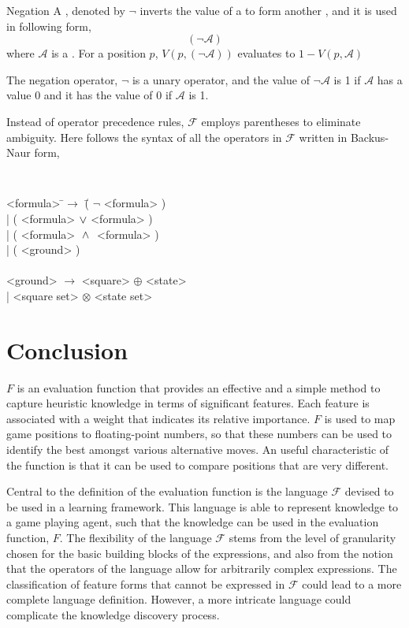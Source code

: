 \begin{definition} {Negation}
A , denoted by $\neg$ inverts the value of a  \mywff{} to form another \mywff, and it is used in following form,
\[
( \neg\mathcal{A} )
\]
where $\mathcal{A}$  is a \mywff.
For a position $p$,  $V(p,(\neg \mathcal{A}))$ evaluates to $1 - V(p,\mathcal{A})$
\end{definition}
The negation operator, $\neg$ is a unary operator, and  the value of $\neg \mathcal{A}$ is 1 if $\mathcal{A}$ has a value 0 and it has the value of 0 if $\mathcal{A}$ is 1.

Instead of operator precedence rules, $\mathcal{F}$ employs parentheses to eliminate ambiguity. Here follows the syntax of all the operators in $\mathcal{F}$ written in Backus-Naur form,

{\tt \small
\begin{tabbing}
<formula> \=$\rightarrow$ \= ( $\neg$ <formula> ) \\
	\>| \> ( <formula> $\vee$ <formula> ) \\
	\>|\> ( <formula> $\;\wedge\;$ <formula> ) \\
	\>|\> ( <ground> )  \\
	\\
<ground> \>$\rightarrow$\> <square> $\oplus$ <state>	\\
	\>|\> <square set> $\otimes$ <state set> \\
\end{tabbing}
}	

\section{Conclusion}
\label{sec:knowledge-conclusion}
 
$F$ is an evaluation function that provides an effective and a simple method to capture heuristic knowledge in terms of significant features. Each feature is associated with a weight that indicates its relative importance.  $F$ is used to map game positions to floating-point numbers, so that these numbers can be used to identify the best amongst various alternative moves. An useful characteristic of the function is that it can be used to compare positions that are very different.

Central to the definition of the evaluation function is the language $\mathcal{F}$ devised to be used in a learning framework. This language is able to represent knowledge to a game playing agent, such that the knowledge can be used in the evaluation function, $F$. The flexibility of the language $\mathcal{F}$ stems from the level of granularity chosen for the basic building blocks of the expressions, and also from the notion that the operators of the language allow for arbitrarily complex expressions. The classification of feature forms that cannot be expressed in $\mathcal{F}$ could lead to a more complete language definition.  However, a more intricate language could complicate the knowledge discovery process.  


